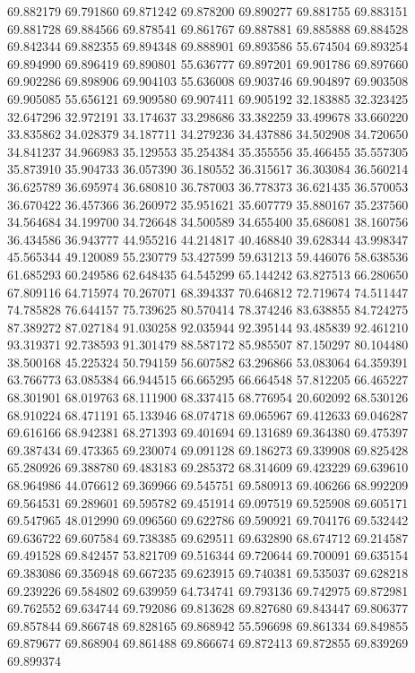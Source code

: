 69.882179
69.791860
69.871242
69.878200
69.890277
69.881755
69.883151
69.881728
69.884566
69.878541
69.861767
69.887881
69.885888
69.884528
69.842344
69.882355
69.894348
69.888901
69.893586
55.674504
69.893254
69.894990
69.896419
69.890801
55.636777
69.897201
69.901786
69.897660
69.902286
69.898906
69.904103
55.636008
69.903746
69.904897
69.903508
69.905085
55.656121
69.909580
69.907411
69.905192
32.183885
32.323425
32.647296
32.972191
33.174637
33.298686
33.382259
33.499678
33.660220
33.835862
34.028379
34.187711
34.279236
34.437886
34.502908
34.720650
34.841237
34.966983
35.129553
35.254384
35.355556
35.466455
35.557305
35.873910
35.904733
36.057390
36.180552
36.315617
36.303084
36.560214
36.625789
36.695974
36.680810
36.787003
36.778373
36.621435
36.570053
36.670422
36.457366
36.260972
35.951621
35.607779
35.880167
35.237560
34.564684
34.199700
34.726648
34.500589
34.655400
35.686081
38.160756
36.434586
36.943777
44.955216
44.214817
40.468840
39.628344
43.998347
45.565344
49.120089
55.230779
53.427599
59.631213
59.446076
58.638536
61.685293
60.249586
62.648435
64.545299
65.144242
63.827513
66.280650
67.809116
64.715974
70.267071
68.394337
70.646812
72.719674
74.511447
74.785828
76.644157
75.739625
80.570414
78.374246
83.638855
84.724275
87.389272
87.027184
91.030258
92.035944
92.395144
93.485839
92.461210
93.319371
92.738593
91.301479
88.587172
85.985507
87.150297
80.104480
38.500168
45.225324
50.794159
56.607582
63.296866
53.083064
64.359391
63.766773
63.085384
66.944515
66.665295
66.664548
57.812205
66.465227
68.301901
68.019763
68.111900
68.337415
68.776954
20.602092
68.530126
68.910224
68.471191
65.133946
68.074718
69.065967
69.412633
69.046287
69.616166
68.942381
68.271393
69.401694
69.131689
69.364380
69.475397
69.387434
69.473365
69.230074
69.091128
69.186273
69.339908
69.825428
65.280926
69.388780
69.483183
69.285372
68.314609
69.423229
69.639610
68.964986
44.076612
69.369966
69.545751
69.580913
69.406266
68.992209
69.564531
69.289601
69.595782
69.451914
69.097519
69.525908
69.605171
69.547965
48.012990
69.096560
69.622786
69.590921
69.704176
69.532442
69.636722
69.607584
69.738385
69.629511
69.632890
68.674712
69.214587
69.491528
69.842457
53.821709
69.516344
69.720644
69.700091
69.635154
69.383086
69.356948
69.667235
69.623915
69.740381
69.535037
69.628218
69.239226
69.584802
69.639959
64.734741
69.793136
69.742975
69.872981
69.762552
69.634744
69.792086
69.813628
69.827680
69.843447
69.806377
69.857844
69.866748
69.828165
69.868942
55.596698
69.861334
69.849855
69.879677
69.868904
69.861488
69.866674
69.872413
69.872855
69.839269
69.899374
